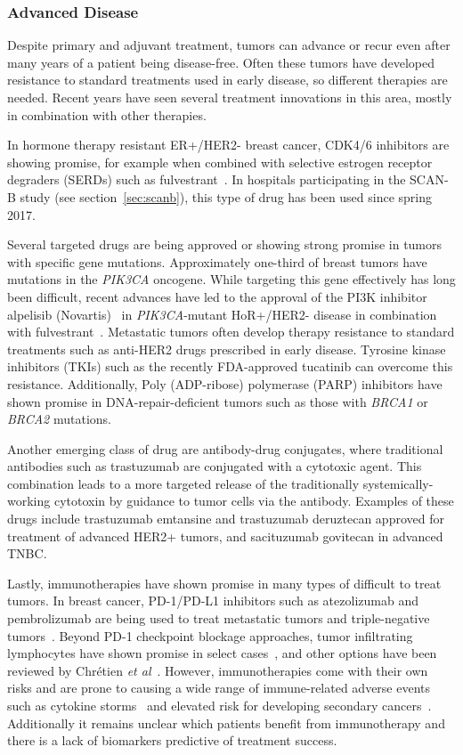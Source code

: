 \documentclass[11pt]{book}
\newcommand{\scanb}{\mbox{SCAN-B}}
\begin{document}
\subsubsection{Advanced Disease}

Despite primary and adjuvant treatment, tumors can advance or recur even after many years of a patient being disease-free. Often these tumors have developed resistance to standard treatments used in early disease, so different therapies are needed. Recent years have seen several treatment innovations in this area, mostly in combination with other therapies.

In hormone therapy resistant ER+/HER2- breast cancer, CDK4/6 inhibitors are showing promise, for example when combined with selective estrogen receptor degraders (SERDs) such as fulvestrant~\cite{Gao:2020}. In hospitals participating in the \scanb{} study (see section~\ref{sec:scanb}), this type of drug has been used since spring 2017.

Several targeted drugs are being approved or showing strong promise in tumors with specific gene mutations. Approximately one-third of breast tumors have mutations in the \textit{PIK3CA} oncogene. While targeting this gene effectively has long been difficult, recent advances have led to the approval of the PI3K inhibitor alpelisib (Novartis)~\cite{Juric:2018} in \textit{PIK3CA}-mutant HoR+/HER2- disease in combination with fulvestrant~\cite{Andre:2019}. Metastatic tumors often develop therapy resistance to standard treatments such as anti-HER2 drugs prescribed in early disease. Tyrosine kinase inhibitors (TKIs) such as the recently FDA-approved tucatinib can overcome this resistance. Additionally, Poly (ADP-ribose) polymerase (PARP) inhibitors have shown promise in DNA-repair-deficient tumors such as those with \textit{BRCA1} or \textit{BRCA2} mutations.

Another emerging class of drug are antibody-drug conjugates, where traditional antibodies such as trastuzumab are conjugated with a cytotoxic agent. This combination leads to a more targeted release of the traditionally systemically-working cytotoxin by guidance to tumor cells via the antibody. Examples of these drugs include trastuzumab emtansine and trastuzumab deruztecan approved for treatment of advanced HER2+ tumors, and sacituzumab govitecan in advanced TNBC.

Lastly, immunotherapies have shown promise in many types of difficult to treat tumors. In breast cancer, PD-1/PD-L1 inhibitors such as atezolizumab and pembrolizumab are being used to treat metastatic tumors and triple-negative tumors~\cite{Marra:2019}. Beyond PD-1 checkpoint blockage approaches, tumor infiltrating lymphocytes have shown promise in select cases~\cite{Zacharakis:2018}, and other options have been reviewed by Chrétien \textit{et al}~\cite{Chretien:2019}. However, immunotherapies come with their own risks and are prone to causing a wide range of immune-related adverse events such as cytokine storms~\cite{Postow:2018} and elevated risk for developing secondary cancers~\cite{Wartewig:2017, LudinZon:2017}. Additionally it remains unclear which patients benefit from immunotherapy and there is a lack of biomarkers predictive of treatment success.
\end{document}
